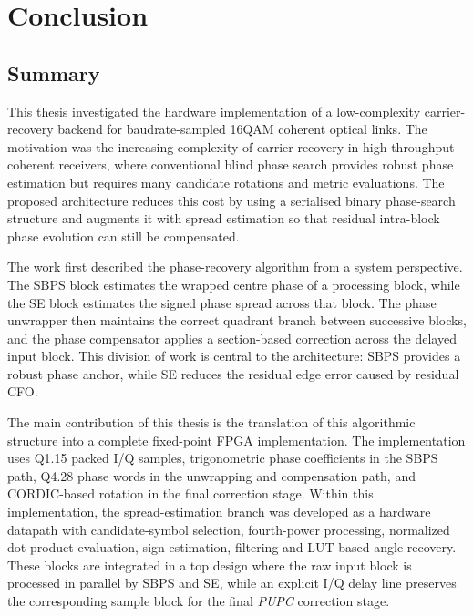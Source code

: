 \chapter{Conclusion}\label{Conclusion}

\section{Summary}

This thesis investigated the hardware implementation of a low-complexity carrier-recovery backend for baudrate-sampled \ac{16QAM} coherent optical links. The motivation was the increasing complexity of carrier recovery in high-throughput coherent receivers, where conventional blind phase search provides robust phase estimation but requires many candidate rotations and metric evaluations. The proposed architecture reduces this cost by using a serialised binary phase-search structure and augments it with spread estimation so that residual intra-block phase evolution can still be compensated.

The work first described the phase-recovery algorithm from a system perspective. The \ac{SBPS} block estimates the wrapped centre phase of a processing block, while the \ac{SE} block estimates the signed phase spread across that block. The phase unwrapper then maintains the correct quadrant branch between successive blocks, and the phase compensator applies a section-based correction across the delayed input block. This division of work is central to the architecture: \ac{SBPS} provides a robust phase anchor, while \ac{SE} reduces the residual edge error caused by residual \ac{CFO}.

The main contribution of this thesis is the translation of this algorithmic structure into a complete fixed-point \ac{FPGA} implementation. The implementation uses Q1.15 packed I/Q samples, trigonometric phase coefficients in the \ac{SBPS} path, Q4.28 phase words in the unwrapping and compensation path, and CORDIC-based rotation in the final correction stage. Within this implementation, the spread-estimation branch was developed as a hardware datapath with candidate-symbol selection, fourth-power processing, normalized dot-product evaluation, sign estimation, filtering and \ac{LUT}-based angle recovery. These blocks are integrated in a top design where the raw input block is processed in parallel by \ac{SBPS} and \ac{SE}, while an explicit I/Q delay line preserves the corresponding sample block for the final \textit{PUPC} correction stage.

